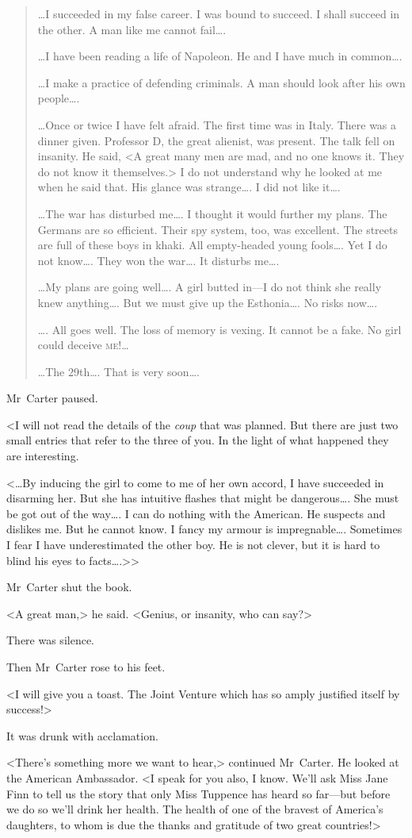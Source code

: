 \begin{quotation}
\dots I succeeded in my false career. I was bound to succeed. I shall succeed in the other. A man like me cannot fail\dots.

\dots I have been reading a life of Napoleon. He and I have much in common\dots.

\dots I make a practice of defending criminals. A man should look after his own people\dots.

\dots Once or twice I have felt afraid. The first time was in Italy. There was a dinner given. Professor D\doubleemdash, the great alienist, was present. The talk fell on insanity. He said, <A great many men are mad, and no one knows it. They do not know it themselves.> I do not understand why he looked at me when he said that. His glance was strange\dots. I did not like it\dots.

\dots The war has disturbed me\dots. I thought it would further my plans. The Germans are so efficient. Their spy system, too, was excellent. The streets are full of these boys in khaki. All empty-headed young fools\dots. Yet I do not know\dots. They won the war\dots. It disturbs me\dots.

\dots My plans are going well\dots. A girl butted in—I do not think she really knew anything\dots. But we must give up the Esthonia\dots. No risks now\dots.

\dots. All goes well. The loss of memory is vexing. It cannot be a fake. No girl could deceive \textsc{me}!\dots

\dots The 29th\dots. That is very soon\dots.
\end{quotation}

Mr~Carter paused.

<I will not read the details of the \textit{coup} that was planned. But there are just two small entries that refer to the three of you. In the light of what happened they are interesting.

<\dots By inducing the girl to come to me of her own accord, I have succeeded in disarming her. But she has intuitive flashes that might be dangerous\dots. She must be got out of the way\dots. I can do nothing with the American. He suspects and dislikes me. But he cannot know. I fancy my armour is impregnable\dots. Sometimes I fear I have underestimated the other boy. He is not clever, but it is hard to blind his eyes to facts\dots.>>

Mr~Carter shut the book.

<A great man,> he said. <Genius, or insanity, who can say?>

There was silence.

Then Mr~Carter rose to his feet.

<I will give you a toast. The Joint Venture which has so amply justified itself by success!>

It was drunk with acclamation.

<There's something more we want to hear,> continued Mr~Carter. He looked at the American Ambassador. <I speak for you also, I know. We'll ask Miss Jane Finn to tell us the story that only Miss Tuppence has heard so far—but before we do so we'll drink her health. The health of one of the bravest of America's daughters, to whom is due the thanks and gratitude of two great countries!> 